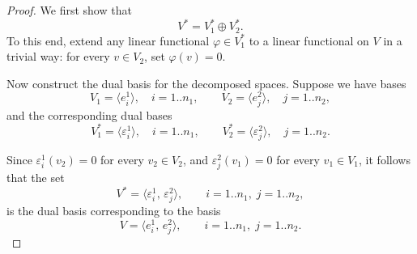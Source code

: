 \documentclass[10pt,a4paper]{amsart}
\begin{document}
\begin{proof}
We first show that
\[
    V^* = V_1^* \oplus V_2^*.
\]
To this end, extend any linear functional $\varphi \in V_1^*$ to a linear functional on $V$ in a trivial way: for every $v \in V_2$, set $\varphi(v) = 0$.

Now construct the dual basis for the decomposed spaces. Suppose we have bases
\[
    V_1 = \langle e^1_i \rangle,\quad i = 1..n_1,
    \qquad
    V_2 = \langle e^2_j \rangle,\quad j = 1..n_2,
\]
and the corresponding dual bases
\[
    V_1^* = \langle \varepsilon^1_i \rangle,\quad i = 1..n_1,
    \qquad
    V_2^* = \langle \varepsilon^2_j \rangle,\quad j = 1..n_2.
\]

Since $\varepsilon^1_i(v_2) = 0$ for every $v_2 \in V_2$, and $\varepsilon^2_j(v_1) = 0$ for every $v_1 \in V_1$, it follows that the set
\[
    V^* = \langle \varepsilon^1_i,\, \varepsilon^2_j \rangle,
    \qquad i = 1..n_1,\; j = 1..n_2,
\]
is the dual basis corresponding to the basis
\[
    V = \langle e^1_i,\, e^2_j \rangle,
    \qquad i = 1..n_1,\; j = 1..n_2.
\]
\end{proof}
\end{document}

